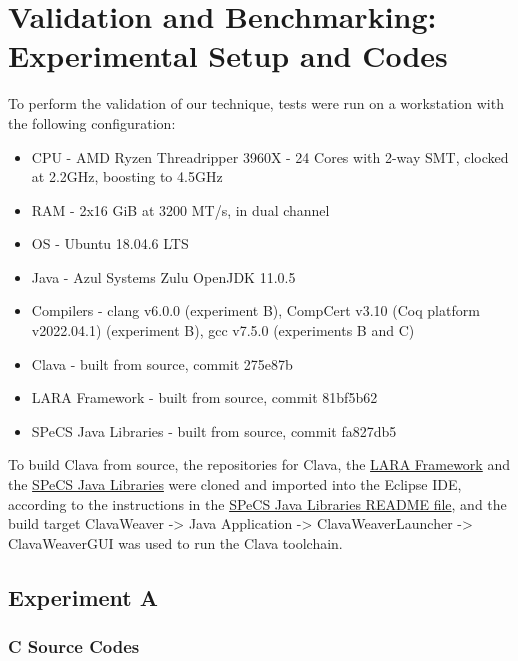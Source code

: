 \chapter{Validation and Benchmarking: Experimental Setup and Codes} \label{ap:validation}

To perform the validation of our technique, tests were run on a workstation with the following configuration:

\begin{itemize}
    \item CPU - AMD Ryzen Threadripper 3960X - 24 Cores with 2-way SMT, clocked at 2.2GHz, boosting to 4.5GHz
    \item RAM - 2x16 GiB at 3200 MT/s, in dual channel
    \item OS - Ubuntu 18.04.6 LTS
    \item Java - Azul Systems Zulu OpenJDK 11.0.5
    \item Compilers - clang v6.0.0 (experiment B), CompCert v3.10 (Coq platform v2022.04.1) (experiment B), gcc v7.5.0 (experiments B and C)
    \item Clava - built from source, commit 275e87b
    \item LARA Framework - built from source, commit 81bf5b62
    \item SPeCS Java Libraries - built from source, commit fa827db5
\end{itemize}

To build Clava from source, the repositories for Clava, the \href{https://github.com/specs-feup/lara-framework/tree/81bf5b624b0aa37ddd0bebda2b24e2a126f12609}{LARA Framework} and the \href{https://github.com/specs-feup/specs-java-libs/tree/fa827db586d7b2cbf94fff98873ee339f04cb694}{SPeCS Java Libraries} were cloned and imported into the Eclipse IDE, according to the instructions in the \href{https://github.com/specs-feup/specs-java-libs/blob/fa827db586d7b2cbf94fff98873ee339f04cb694/README.md}{SPeCS Java Libraries README file}, and the build target ClavaWeaver -> Java Application -> ClavaWeaverLauncher -> ClavaWeaverGUI was used to run the Clava toolchain.

\section{Experiment A}

\subsection{C Source Codes}

